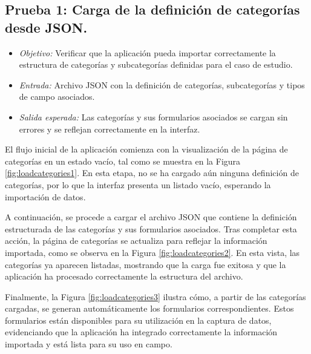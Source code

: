 \documentclass{article}
\begin{document}
\subsection{Prueba 1: Carga de la definición de categorías desde JSON.}
\begin{itemize}
    \item \textit{Objetivo:} Verificar que la aplicación pueda importar correctamente la estructura de categorías y subcategorías definidas para el caso de estudio.
    \item \textit{Entrada:} Archivo JSON con la definición de categorías, subcategorías y tipos de campo asociados.
    \item \textit{Salida esperada:} Las categorías y sus formularios asociados se cargan sin errores y se reflejan correctamente en la interfaz.
\end{itemize}

El flujo inicial de la aplicación comienza con la visualización de la página de categorías en un estado vacío, tal como se muestra en la Figura \ref{fig:loadcategories1}. En esta etapa, no se ha cargado aún ninguna definición de categorías, por lo que la interfaz presenta un listado vacío, esperando la importación de datos.

A continuación, se procede a cargar el archivo JSON que contiene la definición estructurada de las categorías y sus formularios asociados. Tras completar esta acción, la página de categorías se actualiza para reflejar la información importada, como se observa en la Figura \ref{fig:loadcategories2}. En esta vista, las categorías ya aparecen listadas, mostrando que la carga fue exitosa y que la aplicación ha procesado correctamente la estructura del archivo.

Finalmente, la Figura \ref{fig:loadcategories3} ilustra cómo, a partir de las categorías cargadas, se generan automáticamente los formularios correspondientes. Estos formularios están disponibles para su utilización en la captura de datos, evidenciando que la aplicación ha integrado correctamente la información importada y está lista para su uso en campo.
\end{document}
